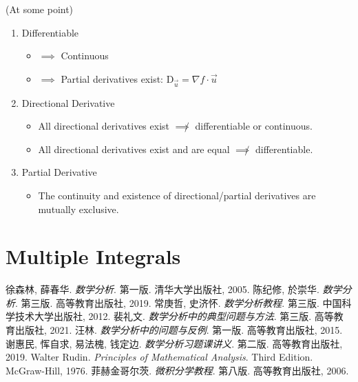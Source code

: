 \documentclass[11pt]{elegantbook}
\begin{document}
\begin{note}{(At some point)}
    \begin{enumerate}
        \item  Differentiable
            \begin{itemize}
                \item \(\implies\) Continuous
                \item \(\implies\) Partial derivatives exist: \(\mathrm{D}_{\vec{u}}=\nabla f\cdot\vec{u}\)
            \end{itemize}
        \item  Directional Derivative
            \begin{itemize}
                \item All directional derivatives exist \(\not\implies\) differentiable or continuous.
                \item All directional derivatives exist and are equal \(\not\implies\) differentiable.
            \end{itemize}
        \item  Partial Derivative
        \begin{itemize}
            \item  The continuity and existence of directional/partial derivatives are mutually exclusive.
        \end{itemize}
    \end{enumerate}
\end{note}




\chapter{Multiple Integrals}




\begin{thebibliography}{99} 
 徐森林, 薛春华. \emph{数学分析}. 第一版. 清华大学出版社, 2005.
 陈纪修, 於崇华. \emph{数学分析}. 第三版. 高等教育出版社, 2019.
 常庚哲, 史济怀. \emph{数学分析教程}. 第三版. 中国科学技术大学出版社, 2012.
 裴礼文. \emph{数学分析中的典型问题与方法}. 第三版. 高等教育出版社, 2021.
 汪林. \emph{数学分析中的问题与反例}. 第一版. 高等教育出版社, 2015.
 谢惠民, 恽自求, 易法槐, 钱定边. \emph{数学分析习题课讲义}. 第二版. 高等教育出版社, 2019.
 Walter Rudin. \emph{Principles of Mathematical Analysis}. Third Edition. McGraw-Hill, 1976.
 菲赫金哥尔茨. \emph{微积分学教程}. 第八版. 高等教育出版社, 2006.
\end{thebibliography}
\end{document}
